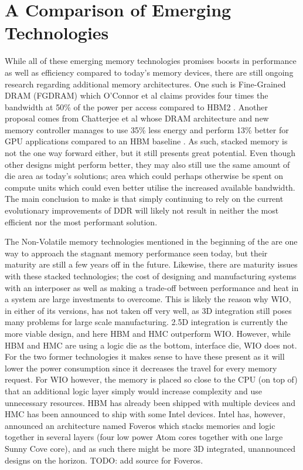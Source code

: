 \section{A Comparison of Emerging Technologies}
While all of these emerging memory technologies promises boosts in performance as well as efficiency compared to today's memory devices, there are still ongoing research regarding additional memory architectures. One such is Fine-Grained DRAM (FGDRAM) which O'Connor et al claims provides four times the bandwidth at 50\% of the power per access compared to HBM2 \cite{O'Connor:2017:FDE:3123939.3124545}. Another proposal comes from Chatterjee et al whose DRAM architecture and new memory controller manages to use 35\% less energy and perform 13\% better for GPU applications compared to an HBM baseline \cite{7920815}. As such, stacked memory is not the one way forward either, but it still presents great potential. Even though other designs might perform better, they may also still use the same amount of die area as today's solutions; area which could perhaps otherwise be spent on compute units which could even better utilise the increased available bandwidth. The main conclusion to make is that simply continuing to rely on the current evolutionary improvements of DDR will likely not result in neither the most efficient nor the most performant solution.
\bigskip

The Non-Volatile memory technologies mentioned in the beginning of the  are one way to approach the stagnant memory performance seen today, but their maturity are still a few years off in the future. Likewise, there are maturity issues with these stacked technologies; the cost of designing and manufacturing systems with an interposer as well as making a trade-off between performance and heat in a system are large investments to overcome. This is likely the reason why WIO, in either of its versions, has not taken off very well, as 3D integration still poses many problems for large scale manufacturing. 2.5D integration is currently the more viable design, and here HBM and HMC outperform WIO. However, while HBM and HMC are using a logic die as the bottom, interface die, WIO does not. For the two former technologies it makes sense to have these present as it will lower the power consumption since it decreases the travel for every memory request. For WIO however, the memory is placed so close to the CPU (on top of) that an additional logic layer simply would increase complexity and use unnecessary resources. HBM has already been shipped with multiple devices and HMC has been announced to ship with some Intel devices. Intel has, however, announced an architecture named Foveros which stacks memories and logic together in several layers (four low power Atom cores together with one large Sunny Cove core), and as such there might be more 3D integrated, unannounced designs on the horizon. TODO: add source for Foveros.
\bigskip

